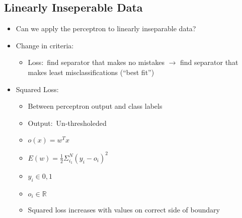 \documentclass[12pt]{article}
\begin{document}
        \subsection{Linearly Inseperable Data}
            \begin{itemize}
                \item Can we apply the perceptron to linearly inseparable data?
                \item Change in criteria:
                \begin{itemize}
                    \item Loss:\ find separator that makes no mistakes $\rightarrow$ find separator that makes least misclassifications (``best fit'')
                \end{itemize}
                \item Squared Loss:
                \begin{itemize}
                    \item Between perceptron output and class labels
                    \item Output:\ Un-thresholeded
                    \item $o(x) = w^T{x}$
                    \item $E(w) = \frac{1}{2}\Sigma_{i_1}^N{(y_i-o_i)}^2$
                    \item $y_i \in {0, 1}$
                    \item $o_i \in \mathbb{R}$
                    \item Squared loss increases with values on correct side of boundary
                \end{itemize}
            \end{itemize}
\end{document}
